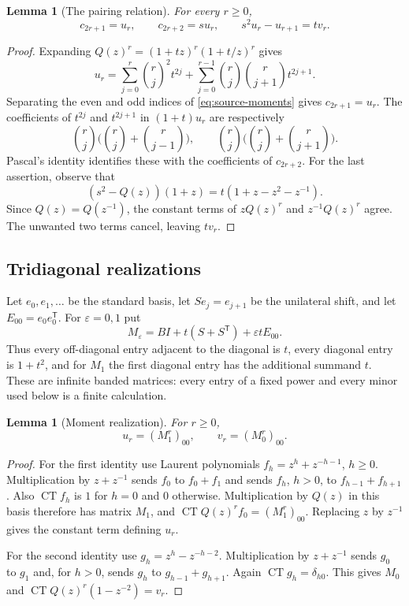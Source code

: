 \documentclass[11pt]{article}
\newtheorem{lemma}[theorem]{Lemma}
\theoremstyle{definition}
\theoremstyle{remark}
\newcommand{\CT}{\operatorname{CT}}
\newcommand{\eps}{\varepsilon}
\numberwithin{equation}{section}
\begin{document}
\begin{lemma}[The pairing relation]
\label{lem:pair}
For every $r\ge0$,
\begin{equation}
 c_{2r+1}=u_r,\qquad c_{2r+2}=s u_r,\qquad
 s^2u_r-u_{r+1}=t v_r.
 \label{eq:pair}
\end{equation}
\end{lemma}
\begin{proof}
Expanding $Q(z)^r=(1+tz)^r(1+t/z)^r$ gives
\begin{equation}
 u_r=\sum_{j=0}^r\binom rj^2t^{2j}
 +\sum_{j=0}^{r-1}\binom rj\binom r{j+1}t^{2j+1}.
 \label{eq:u-binomial}
\end{equation}
Separating the even and odd indices of
\eqref{eq:source-moments} gives $c_{2r+1}=u_r$.
The coefficients of $t^{2j}$ and $t^{2j+1}$ in $(1+t)u_r$ are respectively
\[
 \binom rj\biggl(\binom rj+\binom r{j-1}\biggr),\qquad
 \binom rj\biggl(\binom rj+\binom r{j+1}\biggr).
\]
Pascal's identity identifies these with the coefficients of $c_{2r+2}$.
For the last assertion, observe that
\[
 (s^2-Q(z))(1+z)=t(1+z-z^2-z^{-1}).
\]
Since $Q(z)=Q(z^{-1})$, the constant terms of $zQ(z)^r$ and
$z^{-1}Q(z)^r$ agree. The unwanted two terms cancel, leaving $t v_r$.
\end{proof}

\subsection{Tridiagonal realizations}
Let $e_0,e_1,\ldots$ be the standard basis, let $S e_j=e_{j+1}$ be the
unilateral shift, and let $E_{00}=e_0e_0^{\mathsf T}$. For $\eps=0,1$ put
\begin{equation}
 M_\eps=B I+t(S+S^{\mathsf T})+\eps t E_{00}.
 \label{eq:M}
\end{equation}
Thus every off-diagonal entry adjacent to the diagonal is $t$, every
diagonal entry is $1+t^2$, and for $M_1$ the first diagonal entry has the
additional summand $t$. These are infinite banded matrices: every entry
of a fixed power and every minor used below is a finite calculation.

\begin{lemma}[Moment realization]
\label{lem:realization}
For $r\ge0$,
\begin{equation}
 u_r=(M_1^r)_{00},\qquad v_r=(M_0^r)_{00}.
 \label{eq:moment-M}
\end{equation}
\end{lemma}
\begin{proof}
For the first identity use Laurent polynomials
$f_h=z^h+z^{-h-1}$, $h\ge0$. Multiplication by $z+z^{-1}$ sends
$f_0$ to $f_0+f_1$ and sends $f_h$, $h>0$, to $f_{h-1}+f_{h+1}$.
Also $\CT f_h$ is $1$ for $h=0$ and $0$ otherwise. Multiplication by
$Q(z)$ in this basis therefore has matrix $M_1$, and
$\CT Q(z)^r f_0=(M_1^r)_{00}$. Replacing $z$ by $z^{-1}$ gives the
constant term defining $u_r$.

For the second identity use $g_h=z^h-z^{-h-2}$. Multiplication by
$z+z^{-1}$ sends $g_0$ to $g_1$ and, for $h>0$, sends $g_h$ to
$g_{h-1}+g_{h+1}$. Again $\CT g_h=\delta_{h0}$. This gives $M_0$ and
$\CT Q(z)^r(1-z^{-2})=v_r$.
\end{proof}
\end{document}
